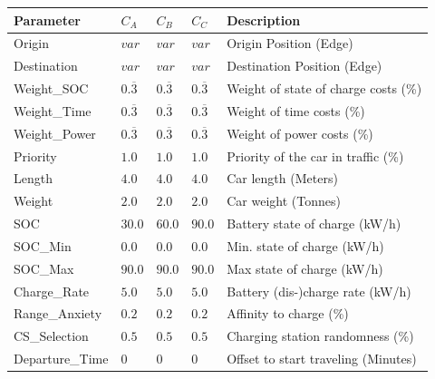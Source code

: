 \begin{table}[h]
	\renewcommand{\arraystretch}{1.3}
	\centering
	\begin{tabular}{lllll}
		\hline
		\textbf{Parameter}          & \textbf{$C_{A}$} & \textbf{$C_{B}$}  & \textbf{$C_{C}$}           & \textbf{Description} \\ \hline
		Origin                      & $var$     & $var$ & $var$    & Origin Position (Edge)      \\
		Destination                 & $var$    & $var$  & $var$     & Destination Position (Edge) \\
		Weight\_SOC              & $0.\overline{3}$  & $0.\overline{3}$ & $0.\overline{3}$ & Weight of state of charge costs (\%)                   \\
		Weight\_Time              & $0.\overline{3}$ & $0.\overline{3}$ & $0.\overline{3}$ & Weight of time costs (\%)                     \\
		Weight\_Power             & $0.\overline{3}$ & $0.\overline{3}$ & $0.\overline{3}$ & Weight of power costs (\%)                      \\
		Priority                  & $1.0$ & $1.0$ & $1.0$ & Priority of the car in traffic (\%)                  \\
		Length                    & $4.0$ & $4.0$ & $4.0$ & Car length (Meters)            \\
		Weight                   & $2.0$ & $2.0$ & $2.0$ & Car weight  (Tonnes)                 \\
		SOC                      & $30.0$ & $60.0$ & $90.0$ & Battery state of charge (kW/h)                   \\
		SOC\_Min               & $0.0$ & $0.0$ & $0.0$ & Min. state of charge (kW/h)                     \\
		SOC\_Max              & $90.0$ & $90.0$ & $90.0$ & Max state of charge (kW/h)                      \\
		Charge\_Rate          & $5.0$ & $5.0$ & $5.0$ & Battery (dis-)charge rate (kW/h)                    \\
		Range\_Anxiety         & $0.2$ & $0.2$ & $0.2$ & Affinity to charge (\%)                     \\
		CS\_Selection		   & $0.5$ & $0.5$ & $0.5$ & Charging station randomness (\%)                    \\ 
		Departure\_Time 	& $0$ & $0$ & $0$ & Offset to start traveling (Minutes)                   \\ \hline
	\end{tabular}
\end{table}

